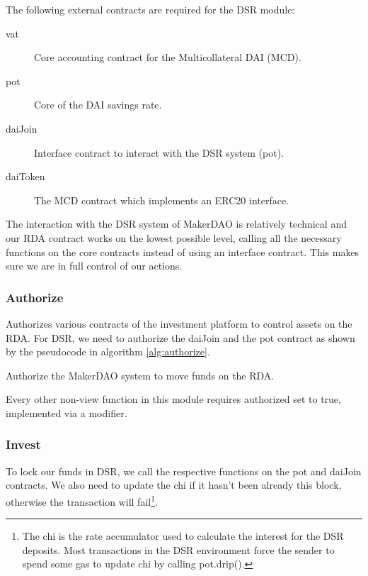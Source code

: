 \documentclass[12pt,a4paper,titlepage,oneside,english]{article}
\begin{document}
The following external contracts are required for the DSR module:

\begin{description}
	\item[vat] Core accounting contract for the Multicollateral DAI (MCD).
	\item[pot] Core of the DAI savings rate.
	\item[daiJoin] Interface contract to interact with the DSR system (pot).
	\item[daiToken] The MCD contract which implements an ERC20 interface.
\end{description}

The interaction with the DSR system of MakerDAO is relatively technical and our RDA contract works on the lowest possible level, calling all the necessary functions on the core contracts instead of using an interface contract. This makes sure we are in full control of our actions.

\subsubsection{Authorize}

Authorizes various contracts of the investment platform to control assets on the RDA.
For DSR, we need to authorize the daiJoin and the pot contract as shown by the pseudocode in algorithm \ref{alg:authorize}.

\begin{algorithm}[H]
	\label{alg:authorize}
	\DontPrintSemicolon
	\caption{Authorize the MakerDAO system to move funds on the RDA.}
\end{algorithm}

Every other non-view function in this module requires authorized set to true, implemented via a modifier.

\subsubsection{Invest}

To lock our funds in DSR, we call the respective functions on the pot and daiJoin contracts. We also need to update the chi if it hasn't been already this block, otherwise the transaction will fail\footnote{The chi is the rate accumulator used to calculate the interest for the DSR deposits. Most transactions in the DSR environment force the sender to spend some gas to update chi by calling pot.drip().}.
\end{document}
